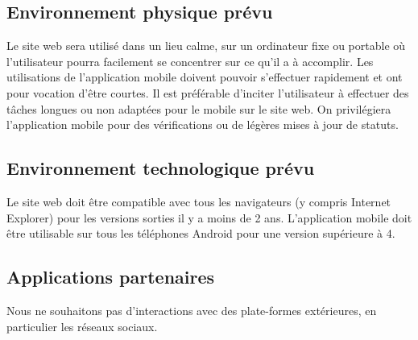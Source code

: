\subsection{Environnement physique prévu}
Le site web sera utilisé dans un lieu calme, sur un ordinateur fixe ou portable où l'utilisateur pourra facilement se concentrer sur ce qu'il a à accomplir. Les utilisations de l'application mobile doivent pouvoir s'effectuer rapidement et ont pour vocation d'être courtes. Il est préférable d'inciter l'utilisateur à effectuer des tâches longues ou non adaptées pour le mobile sur le site web. On privilégiera l'application mobile pour des vérifications ou de légères mises à jour de statuts.

\subsection{Environnement technologique prévu}
Le site web doit être compatible avec tous les navigateurs (y compris Internet Explorer) pour les versions sorties il y a moins de 2 ans. L'application mobile doit être utilisable sur tous les téléphones Android pour une version supérieure à 4.

\subsection{Applications partenaires}
Nous ne souhaitons pas d'interactions avec des plate-formes extérieures, en particulier les réseaux sociaux.